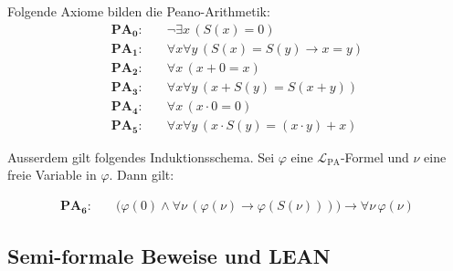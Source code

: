 \begin{math-stroke}
\begin{axioms} %
Folgende Axiome bilden die Peano-Arithmetik:
\begin{align}
\textbf{PA}_{\textbf{0}}\colon &\quad \neg \exists x \, (S(x) = 0) \label{eq:peano-ax0}\\
\textbf{PA}_{\textbf{1}}\colon &\quad \forall x \forall y \, (S(x) = S(y) \to x = y) \label{eq:peano-ax1}\\
\textbf{PA}_{\textbf{2}}\colon &\quad \forall x \, (x + 0 = x) \label{eq:peano-ax2}\\
\textbf{PA}_{\textbf{3}}\colon &\quad \forall x \forall y \, (x + S(y) = S(x + y)) \label{eq:peano-ax3}\\
\textbf{PA}_{\textbf{4}}\colon &\quad \forall x \, (x \cdot 0 = 0) \label{eq:peano-ax4}\\
\textbf{PA}_{\textbf{5}}\colon &\quad \forall x \forall y \, (x \cdot S(y) = (x \cdot y) + x) \label{eq:peano-ax5}
\end{align}

Ausserdem gilt folgendes Induktionsschema.
Sei $\varphi$ eine $\mathcal{L}_{\text{PA}}$-Formel und $\nu$ eine freie Variable in $\varphi$. Dann gilt:

\begin{align}
\textbf{PA}_\textbf{6}\colon &\quad \bigl( \varphi(0) \land \forall \nu \, (\varphi(\nu) \to \varphi(S(\nu))) \bigr) \to \forall \nu \, \varphi(\nu) \label{eq:peano-ax6}
\end{align}

\end{axioms}

\end{math-stroke}

\subsection{Semi-formale Beweise und LEAN}

